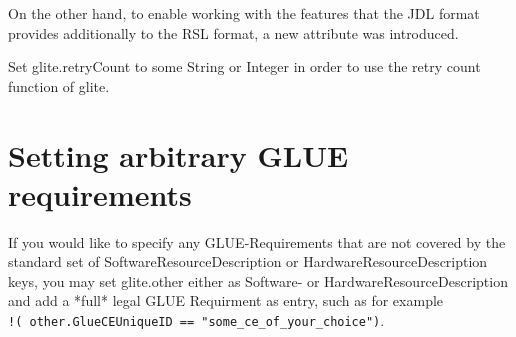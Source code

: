 \documentclass{scrreprt}
\begin{document}
On the other hand, to enable working with the features that the JDL format provides additionally to
the RSL format, a new attribute was introduced.
 
Set glite.retryCount to some String or Integer in order to use the retry count function of glite.

\section{Setting arbitrary GLUE requirements}

If you would like to specify any GLUE-Requirements that are not covered by the standard set of 
SoftwareResourceDescription or HardwareResourceDescription keys, you may set glite.other either as
Software- or HardwareResourceDescription and add a *full* legal GLUE Requirment as entry, such as
for example \\ \verb+!( other.GlueCEUniqueID == "some_ce_of_your_choice")+.
\end{document}

